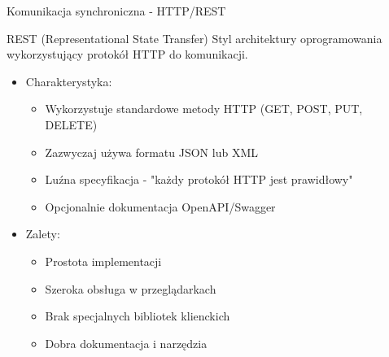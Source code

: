 \documentclass[aspectratio=169]{beamer}
\begin{document}
\begin{frame}{Komunikacja synchroniczna - HTTP/REST}
    \begin{block}{REST (Representational State Transfer)}
        Styl architektury oprogramowania wykorzystujący protokół HTTP do komunikacji.
    \end{block}
    
    \begin{itemize}
        \item Charakterystyka:
        \begin{itemize}
            \item Wykorzystuje standardowe metody HTTP (GET, POST, PUT, DELETE)
            \item Zazwyczaj używa formatu JSON lub XML
            \item Luźna specyfikacja - "każdy protokół HTTP jest prawidłowy"
            \item Opcjonalnie dokumentacja OpenAPI/Swagger
        \end{itemize}
        \vspace{0.3cm}
        \item Zalety:
        \begin{itemize}
            \item Prostota implementacji
            \item Szeroka obsługa w przeglądarkach
            \item Brak specjalnych bibliotek klienckich
            \item Dobra dokumentacja i narzędzia
        \end{itemize}
    \end{itemize}
\end{frame}
\end{document}
